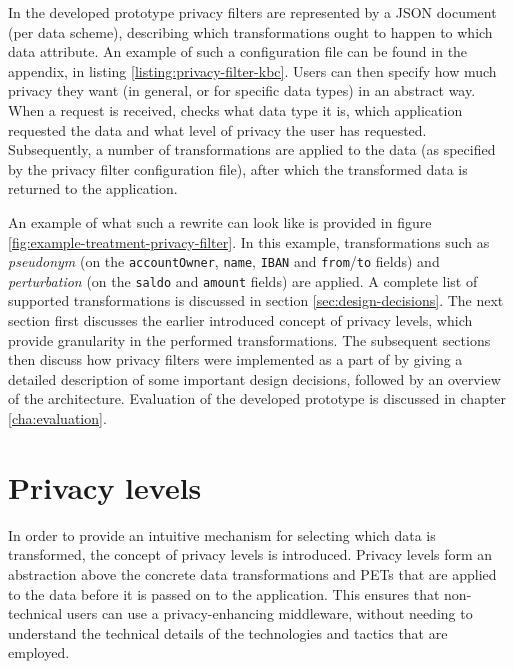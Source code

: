 

\noindent In the developed prototype privacy filters are represented by a JSON document (per data scheme), describing which transformations ought to happen to which data attribute. An example of such a configuration file can be found in the appendix, in listing \ref{listing:privacy-filter-kbc}. Users can then specify how much privacy they want (in general, or for specific data types) in an abstract way. 
When a request is received, \middleware{} checks what data type it is, which application requested the data and what level of privacy the user has requested. Subsequently, a number of transformations are applied to the data (as specified by the privacy filter configuration file), after which the transformed data is returned to the application. 

An example of what such a rewrite can look like is provided in figure \ref{fig:example-treatment-privacy-filter}. In this example, transformations such as \textit{pseudonym} (on the \texttt{accountOwner}, \texttt{name}, \texttt{IBAN} and \texttt{from}/\texttt{to} fields) and \textit{perturbation} (on the \texttt{saldo} and \texttt{amount} fields) are applied. A complete list of supported transformations is discussed in section \ref{sec:design-decisions}. The next section first discusses the earlier introduced concept of privacy levels, which provide granularity in the performed transformations. The subsequent sections then discuss how privacy filters were implemented as a part of \middleware{} by giving a detailed description of some important design decisions, followed by an overview of the architecture. Evaluation of the developed prototype is discussed in chapter \ref{cha:evaluation}.



\section{Privacy levels}
\label{sec:privacylevels}
\noindent In order to provide an intuitive mechanism for selecting which data is transformed, the concept of privacy levels is introduced. Privacy levels form an abstraction above the concrete data transformations and \gls{PETs} that are applied to the data before it is passed on to the application. This ensures that non-technical users can use a privacy-enhancing middleware, without needing to understand the technical details of the technologies and tactics that are employed. 

